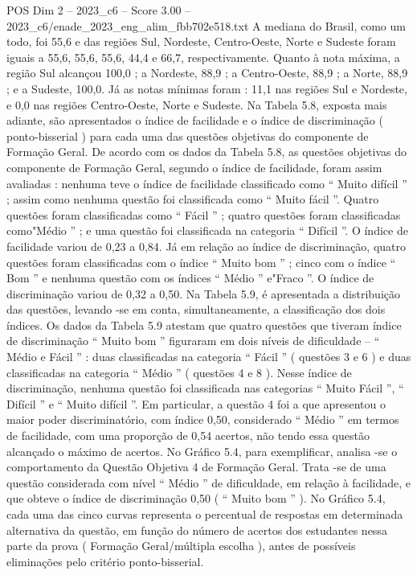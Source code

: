 \begin{textsample}{POS Dim 2 – 2023\_c6 – Score 3.00 – 2023\_c6/enade\_2023\_eng\_alim\_fbb702e518.txt}
A mediana do Brasil, como um todo, foi 55,6 e das regiões Sul, Nordeste, Centro-Oeste, Norte e Sudeste foram iguais a 55,6, 55,6, 55,6, 44,4 e 66,7, respectivamente.
Quanto à nota máxima, a região Sul alcançou 100,0 ; a Nordeste, 88,9 ; a Centro-Oeste, 88,9 ; a Norte, 88,9 ; e a Sudeste, 100,0.
Já as notas mínimas foram : 11,1 nas regiões Sul e Nordeste, e 0,0 nas regiões Centro-Oeste, Norte e Sudeste.
Na Tabela 5.8, exposta mais adiante, são apresentados o índice de facilidade e o índice de discriminação ( ponto-bisserial ) para cada uma das questões objetivas do componente de Formação Geral.
De acordo com os dados da Tabela 5.8, as questões objetivas do componente de Formação Geral, segundo o índice de facilidade, foram assim avaliadas : nenhuma teve o índice de facilidade classificado como “ Muito difícil ” ; assim como nenhuma questão foi classificada como “ Muito fácil ”.
Quatro questões foram classificadas como “ Fácil ” ; quatro questões foram classificadas como"Médio ” ; e uma questão foi classificada na categoria “ Difícil ”.
O índice de facilidade variou de 0,23 a 0,84.
Já em relação ao índice de discriminação, quatro questões foram classificadas com o índice “ Muito bom ” ; cinco com o índice “ Bom ” e nenhuma questão com os índices “ Médio ” e"Fraco ”.
O índice de discriminação variou de 0,32 a 0,50.
Na Tabela 5.9, é apresentada a distribuição das questões, levando -se em conta, simultaneamente, a classificação dos dois índices.
Os dados da Tabela 5.9 atestam que quatro questões que tiveram índice de discriminação “ Muito bom ” figuraram em dois níveis de dificuldade – “ Médio e Fácil ” : duas classificadas na categoria “ Fácil ” ( questões 3 e 6 ) e duas classificadas na categoria “ Médio ” ( questões 4 e 8 ).
Nesse índice de discriminação, nenhuma questão foi classificada nas categorias “ Muito Fácil ”, “ Difícil ” e “ Muito difícil ”.
Em particular, a questão 4 foi a que apresentou o maior poder discriminatório, com índice 0,50, considerado “ Médio ” em termos de facilidade, com uma proporção de 0,54 acertos, não tendo essa questão alcançado o máximo de acertos.
No Gráfico 5.4, para exemplificar, analisa -se o comportamento da Questão Objetiva 4 de Formação Geral.
Trata -se de uma questão considerada com nível “ Médio ” de dificuldade, em relação à facilidade, e que obteve o índice de discriminação 0,50 ( “ Muito bom ” ).
No Gráfico 5.4, cada uma das cinco curvas representa o percentual de respostas em determinada alternativa da questão, em função do número de acertos dos estudantes nessa parte da prova ( Formação Geral/múltipla escolha ), antes de possíveis eliminações pelo critério ponto-bisserial.

\end{textsample}
